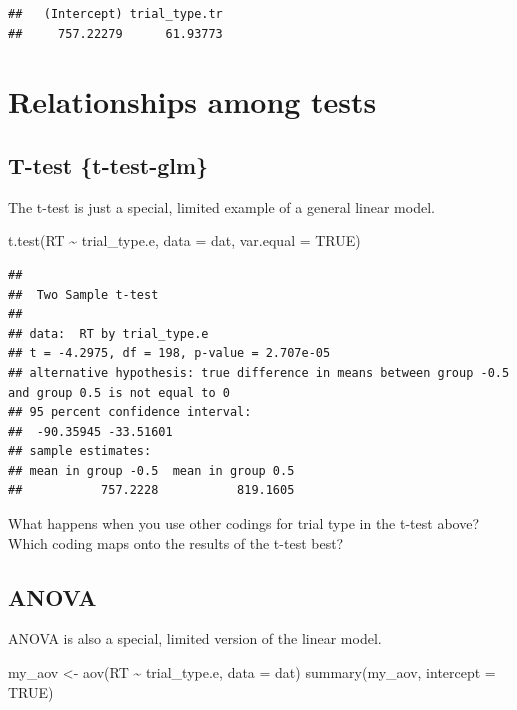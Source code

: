 \documentclass[
  oneside]{book}
\newenvironment{Shaded}{\begin{snugshade}}{\end{snugshade}}
\newcommand{\AttributeTok}[1]{\textcolor[rgb]{0.77,0.63,0.00}{#1}}
\newcommand{\ConstantTok}[1]{\textcolor[rgb]{0.00,0.00,0.00}{#1}}
\newcommand{\FunctionTok}[1]{\textcolor[rgb]{0.00,0.00,0.00}{#1}}
\newcommand{\NormalTok}[1]{#1}
\newcommand{\OtherTok}[1]{\textcolor[rgb]{0.56,0.35,0.01}{#1}}
\newcommand{\SpecialCharTok}[1]{\textcolor[rgb]{0.00,0.00,0.00}{#1}}
\begin{document}
\begin{verbatim}
##   (Intercept) trial_type.tr 
##     757.22279      61.93773
\end{verbatim}

\hypertarget{test-rels}{%
\section{Relationships among tests}\label{test-rels}}

\hypertarget{t-test-t-test-glm}{%
\subsection{T-test \{t-test-glm\}}\label{t-test-t-test-glm}}

The t-test is just a special, limited example of a general linear model.

\begin{Shaded}
\begin{Highlighting}[]
\FunctionTok{t.test}\NormalTok{(RT }\SpecialCharTok{\textasciitilde{}}\NormalTok{ trial\_type.e, }\AttributeTok{data =}\NormalTok{ dat, }\AttributeTok{var.equal =} \ConstantTok{TRUE}\NormalTok{)}
\end{Highlighting}
\end{Shaded}

\begin{verbatim}
## 
##  Two Sample t-test
## 
## data:  RT by trial_type.e
## t = -4.2975, df = 198, p-value = 2.707e-05
## alternative hypothesis: true difference in means between group -0.5 and group 0.5 is not equal to 0
## 95 percent confidence interval:
##  -90.35945 -33.51601
## sample estimates:
## mean in group -0.5  mean in group 0.5 
##           757.2228           819.1605
\end{verbatim}

\begin{try}
What happens when you use other codings for trial type in the t-test above? Which coding maps onto the results of the t-test best?

\end{try}

\hypertarget{anova}{%
\subsection{ANOVA}\label{anova}}

ANOVA is also a special, limited version of the linear model.

\begin{Shaded}
\begin{Highlighting}[]
\NormalTok{my\_aov }\OtherTok{\textless{}{-}} \FunctionTok{aov}\NormalTok{(RT }\SpecialCharTok{\textasciitilde{}}\NormalTok{ trial\_type.e, }\AttributeTok{data =}\NormalTok{ dat)}
\FunctionTok{summary}\NormalTok{(my\_aov, }\AttributeTok{intercept =} \ConstantTok{TRUE}\NormalTok{)}
\end{Highlighting}
\end{Shaded}
\end{document}
